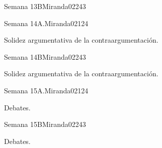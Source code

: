 \begin{syllabus}
\begin{unit}{Semana 13B}{Miranda02}{24}{3}
   \begin{learningoutcomes}
      \item 
      \item
      \item 
      \end{learningoutcomes}
\end{unit}

\begin{unit}{Semana 14A.}{Miranda02}{12}{4}
   \begin{topics}
      \item Solidez argumentativa de la contraargumentación. 
   \end{topics}
   \begin{learningoutcomes}
      \item 
   \end{learningoutcomes}
\end{unit}

\begin{unit}{Semana 14B}{Miranda02}{24}{3}
   \begin{topics}
      \item Solidez argumentativa de la contraargumentación.
   \end{topics}

   \begin{learningoutcomes}
      \item 
      \item
      \item 
      \end{learningoutcomes}
\end{unit}

\begin{unit}{Semana 15A.}{Miranda02}{12}{4}
   \begin{topics}
      \item Debates.
   \end{topics}
   \begin{learningoutcomes}
      \item 
   \end{learningoutcomes}
\end{unit}

\begin{unit}{Semana 15B}{Miranda02}{24}{3}
   \begin{topics}
      \item Debates.
   \end{topics}

   \begin{learningoutcomes}
      \item 
      \item
      \item 
      \end{learningoutcomes}
\end{unit}


\end{syllabus}
